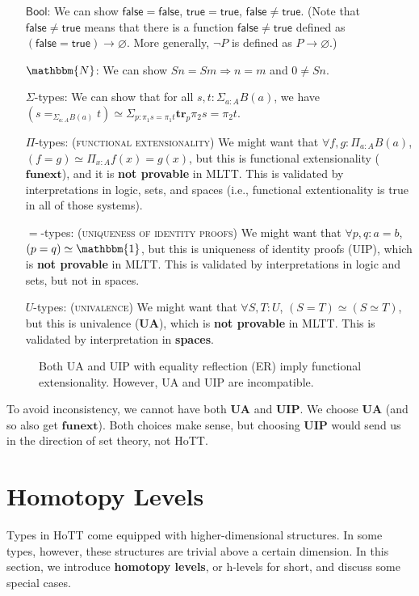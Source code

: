 \documentclass{amsart}
\theoremstyle{definition}
\newcommand{\N}{\mathbbm{N}}
\newcommand{\Bool}{\ensuremath{\mathsf{Bool}}}
\newcommand{\True}{\ensuremath{\mathsf{true}}}
\newcommand{\False}{\ensuremath{\mathsf{false}}}
\renewcommand{\emph}{\textbf}
\renewcommand{\emptyset}{\varnothing}
\begin{document}
\begin{itemize}
\item[\Bool:] We can show $\False = \False$,
$\True = \True$,
$\False \neq \True$. (Note that $\False \neq \True$ means that there is a function $\False \neq \True$ defined as $(\False = \True)\to \emptyset$. More generally, $\neg P$ is defined as $P\to\emptyset$.)
\item[$\N$:] We can show $S n = S m \Rightarrow n = m$ and $0 \neq S n$.
\item[$\Sigma$-types:] We can show that for all $s, t : \Sigma_{a : A} B(a)$, we have $(s \mathbf{=}_{\Sigma_{a : A} B(a)} t) \simeq \Sigma_{p : \pi_1 s = \pi_1 t} \mathbf{tr}_p \pi_2 s = \pi_2 t$.
\item[$\Pi$-types:] \textsc{(functional extensionality)} We might want that $\forall f, g : \Pi_{a : A} B(a)$, $(f = g) \simeq \Pi_{x : A} f(x) = g(x)$, but this is functional extensionality ($\mathbf{funext}$), and it is \textbf{not provable} in MLTT. This is validated by interpretations  in logic, sets, and spaces (i.e., functional extentionality is true in all of those systems).
\item[$=$-types:] \textsc{(uniqueness of identity proofs)} We might want that $\forall p, q : a = b$, $(p = q) \simeq \mathbbm{1}$, but this is uniqueness of identity proofs (UIP), which is \textbf{not provable} in MLTT. This is validated by interpretations in logic and sets, but not in spaces. 
\item[$U$-types:] \textsc{(univalence)} We might want that $\forall S, T : U$, $(S = T) \simeq (S \simeq T)$, but this is univalence ($\mathbf{UA}$), which is \textbf{not provable} in MLTT. This is validated by interpretation in \textbf{spaces}.
\end{itemize}

\begin{figure}[h]
    \centering
    
    \caption{Both UA and UIP with equality reflection (ER) imply functional extensionality.
    However, UA and UIP are incompatible.}
    \label{fig:ua-uip-funext}
\end{figure}

To avoid inconsistency, we cannot have both $\mathbf{UA}$ and $\mathbf{UIP}$. We choose $\mathbf{UA}$ (and so also get $\mathbf{funext}$). 
Both choices make sense, but choosing $\mathbf{UIP}$ would send us in the direction of set theory, not HoTT.

\section{Homotopy Levels}
Types in HoTT come equipped with higher-dimensional structures.
In some types, however, these structures are trivial above a certain dimension.
In this section, we introduce \emph{homotopy levels}, or h-levels for short, and discuss some special cases.
\end{document}
